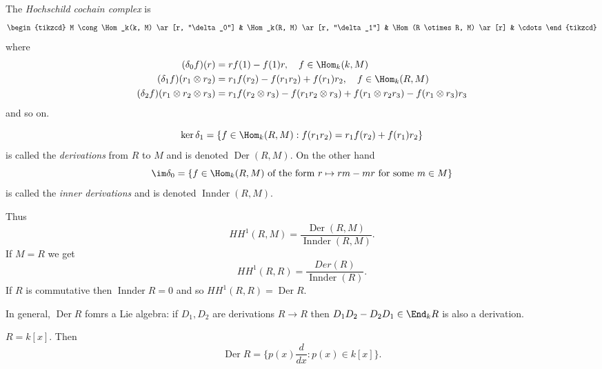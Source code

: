 \documentclass[a4paper]{article}
\DeclareMathOperator{\Der}{Der}
\DeclareMathOperator{\Innder}{Innder}
\begin{document}
\begin{definition}
  The \emph{Hochschild cochain complex} is
  \[
    \begin{tikzcd}
      M \cong \Hom_k(k, M) \ar[r, "\delta_0"] & \Hom_k(R, M) \ar[r, "\delta_1"] & \Hom(R \otimes R, M) \ar[r] & \cdots
    \end{tikzcd}
  \]
  where
  \begin{align*}
    (\delta_0 f)(r) &= rf(1) - f(1) r, \quad f \in \Hom_k(k, M) \\
    (\delta_1 f)(r_1 \otimes r_2) &= r_1 f(r_2) - f(r_1r_2) + f(r_1)r_2, \quad f \in \Hom_k(R, M) \\
    (\delta_2 f)(r_1 \otimes r_2 \otimes r_3) &= r_1 f(r_2 \otimes r_3) - f(r_1r_2 \otimes r_3) + f(r_1 \otimes r_2r_3) - f(r_1 \otimes r_3) r_3 \\
  \end{align*}
  and so on.
\end{definition}

\begin{definition}
  \[
    \ker \delta_1 = \{f \in \Hom_k(R, M): f(r_1r_2) = r_1f(r_2) + f(r_1)r_2\}
  \]
  is called the \emph{derivations} from \(R\) to \(M\) and is denoted \(\Der(R, M)\). On the other hand
  \[
    \im \delta_0 = \{f \in \Hom_k(R, M) \text{ of the form } r \mapsto rm - mr \text{ for some } m \in M\}
  \]
  is called the \emph{inner derivations} and is denoted \(\Innder(R, M)\).
\end{definition}

Thus
\[
  HH^1(R, M) = \frac{\Der(R, M)}{\Innder(R, M)}.
\]
If \(M = R\) we get
\[
  HH^1(R, R) = \frac{Der(R)}{\Innder(R)}.
\]
If \(R\) is commutative then \(\Innder R = 0\) and so \(HH^1(R, R) = \Der R\).

In general, \(\Der R\) fomrs a Lie algebra: if \(D_1, D_2\) are derivations \(R \to R\) then \(D_1D_2 - D_2D_1 \in \End_k R\) is also a derivation.

\begin{eg}
  \(R = k[x]\). Then
  \[
    \Der R = \{p(x) \frac{d}{dx}: p(x) \in k[x]\}.
  \]
\end{eg}





\printindex
\end{document}
